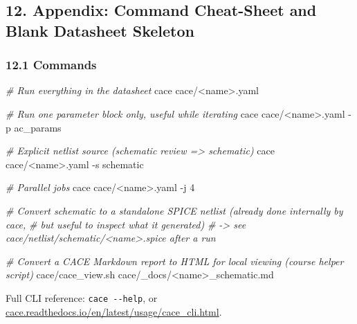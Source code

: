 \documentclass[
]{article}
\newenvironment{Shaded}{}{}
\newcommand{\CommentTok}[1]{\textcolor[rgb]{0.38,0.63,0.69}{\textit{#1}}}
\newcommand{\ExtensionTok}[1]{#1}
\newcommand{\NormalTok}[1]{#1}
\newcommand{\OperatorTok}[1]{\textcolor[rgb]{0.40,0.40,0.40}{#1}}
\begin{document}
\hypertarget{appendix-command-cheat-sheet-and-blank-datasheet-skeleton}{%
\subsection{12. Appendix: Command Cheat-Sheet and Blank Datasheet
Skeleton}\label{appendix-command-cheat-sheet-and-blank-datasheet-skeleton}}

\hypertarget{commands}{%
\subsubsection{12.1 Commands}\label{commands}}

\begin{Shaded}
\begin{Highlighting}[]
\CommentTok{\# Run everything in the datasheet}
\ExtensionTok{cace}\NormalTok{ cace/}\OperatorTok{\textless{}}\NormalTok{name}\OperatorTok{\textgreater{}}\NormalTok{.yaml}

\CommentTok{\# Run one parameter block only, useful while iterating}
\ExtensionTok{cace}\NormalTok{ cace/}\OperatorTok{\textless{}}\NormalTok{name}\OperatorTok{\textgreater{}}\NormalTok{.yaml {-}p ac\_params}

\CommentTok{\# Explicit netlist source (schematic review =\textgreater{} schematic)}
\ExtensionTok{cace}\NormalTok{ cace/}\OperatorTok{\textless{}}\NormalTok{name}\OperatorTok{\textgreater{}}\NormalTok{.yaml {-}s schematic}

\CommentTok{\# Parallel jobs}
\ExtensionTok{cace}\NormalTok{ cace/}\OperatorTok{\textless{}}\NormalTok{name}\OperatorTok{\textgreater{}}\NormalTok{.yaml {-}j 4}

\CommentTok{\# Convert schematic to a standalone SPICE netlist (already done internally by cace,}
\CommentTok{\# but useful to inspect what it generated)}
\CommentTok{\# {-}\textgreater{} see cace/netlist/schematic/\textless{}name\textgreater{}.spice after a run}

\CommentTok{\# Convert a CACE Markdown report to HTML for local viewing (course helper script)}
\ExtensionTok{cace/cace\_view.sh}\NormalTok{ cace/\_docs/}\OperatorTok{\textless{}}\NormalTok{name}\OperatorTok{\textgreater{}}\NormalTok{\_schematic.md}
\end{Highlighting}
\end{Shaded}

Full CLI reference: \texttt{cace\ -\/-help}, or
\href{https://cace.readthedocs.io/en/latest/usage/cace_cli.html}{cace.readthedocs.io/en/latest/usage/cace\_cli.html}.
\end{document}
